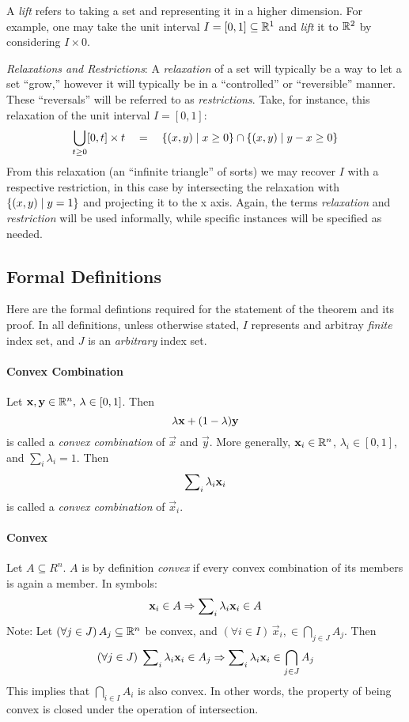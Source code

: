 \documentclass[a4,fleqn]{article}
\begin{document}
A \textit{lift} refers to taking a set and representing it in a higher dimension.  For example, one may take the unit interval $I = [0,1] \subseteq \mathbb{R}^1$ and \textit{lift} it to $\mathbb{R}^2$ by considering $I \times {0}$.  

\textit{Relaxations and Restrictions}: A \textit{relaxation} of a set will typically be a way to let a set ``grow,'' however it will typically be in a ``controlled'' or ``reversible'' manner.  These ``reversals'' will be referred to as \textit{restrictions}.  Take, for instance, this relaxation of the unit interval $I = [0,1]$: 
  \[\bigcup_{t \geq 0} [0,t]\times t \quad=\quad 
    \{(x,y) \;|\; x \geq 0\} \cap \{(x,y) \;|\; y - x \geq 0\}\]  
From this relaxation (an ``infinite triangle'' of sorts) we may recover $I$ with a respective restriction, in this case by intersecting the relaxation with ${\{(x,y) \;|\; y = 1\}}$ and projecting it to the x axis.  Again, the terms \textit{relaxation} and \textit{restriction} will be used informally, while specific instances will be specified as needed.


\subsection{Formal Definitions}
Here are the formal defintions required for the statement of the theorem and its proof.  In all definitions, unless otherwise stated, $I$ represents and arbitray \textit{finite} index set, and $J$ is an \textit{arbitrary} index set.

\paragraph{Convex Combination} 
Let $\mathbf{x},\mathbf{y} \in \mathbb{R}^n,\, \lambda \in [0,1]$.  Then
  \[\lambda \mathbf{x} + (1-\lambda) \mathbf{y}\]
is called a \textit{convex combination} of $\vec{x}$ and $\vec{y}$.
More generally, $\mathbf{x}_i \in \mathbb{R}^n$, $\lambda_i \in [0,1]$, and $\sum_i \lambda_i = 1$.  Then 
  \[\sum\nolimits_{i} \lambda_{i} \mathbf{x}_{i}\]
is called a \textit{convex combination} of $\vec{x}_i$.

\paragraph{Convex} 
Let $A \subseteq R^n$.  $A$ is by definition \textit{convex} if every convex combination of its members is again a member.  In symbols:
  \[\mathbf{x}_i \in A \Rightarrow
    \sum\nolimits_{i} \lambda_{i} \mathbf{x}_{i} \in A\]
Note: Let $(\forall j \in J) \, A_j \subseteq \mathbb{R}^n$ be convex, and $(\forall i\in I)\,\vec{x}_i, \in \bigcap_{j\in J}A_j$.  Then 
  \[(\forall j\in J)\; \sum\nolimits_{i} \lambda_{i} \mathbf{x}_{i} \in A_j \Rightarrow \sum\nolimits_{i} \lambda_{i} \mathbf{x}_{i} \in \bigcap_{j \in J} A_j\]  
 This implies that $\bigcap_{i \in I} A_i$ is also convex.  In other words, the property of being convex is closed under the operation of intersection.
\end{document}
